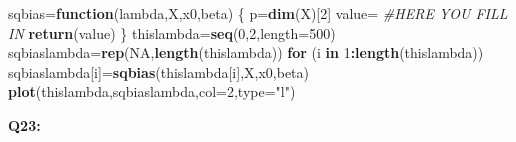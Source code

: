 \documentclass[]{article}
\newenvironment{Shaded}{\begin{snugshade}}{\end{snugshade}}
\newcommand{\KeywordTok}[1]{\textcolor[rgb]{0.13,0.29,0.53}{\textbf{#1}}}
\newcommand{\DataTypeTok}[1]{\textcolor[rgb]{0.13,0.29,0.53}{#1}}
\newcommand{\DecValTok}[1]{\textcolor[rgb]{0.00,0.00,0.81}{#1}}
\newcommand{\StringTok}[1]{\textcolor[rgb]{0.31,0.60,0.02}{#1}}
\newcommand{\CommentTok}[1]{\textcolor[rgb]{0.56,0.35,0.01}{\textit{#1}}}
\newcommand{\OtherTok}[1]{\textcolor[rgb]{0.56,0.35,0.01}{#1}}
\newcommand{\ControlFlowTok}[1]{\textcolor[rgb]{0.13,0.29,0.53}{\textbf{#1}}}
\newcommand{\OperatorTok}[1]{\textcolor[rgb]{0.81,0.36,0.00}{\textbf{#1}}}
\newcommand{\NormalTok}[1]{#1}
\begin{document}
\begin{Shaded}
\begin{Highlighting}[]
\NormalTok{sqbias=}\ControlFlowTok{function}\NormalTok{(lambda,X,x0,beta)}
\NormalTok{\{}
\NormalTok{  p=}\KeywordTok{dim}\NormalTok{(X)[}\DecValTok{2}\NormalTok{]}
\NormalTok{  value=}\StringTok{ }\CommentTok{#HERE YOU FILL IN}
\StringTok{  }\KeywordTok{return}\NormalTok{(value)}
\NormalTok{\}}
\NormalTok{thislambda=}\KeywordTok{seq}\NormalTok{(}\DecValTok{0}\NormalTok{,}\DecValTok{2}\NormalTok{,}\DataTypeTok{length=}\DecValTok{500}\NormalTok{)}
\NormalTok{sqbiaslambda=}\KeywordTok{rep}\NormalTok{(}\OtherTok{NA}\NormalTok{,}\KeywordTok{length}\NormalTok{(thislambda))}
\ControlFlowTok{for}\NormalTok{ (i }\ControlFlowTok{in} \DecValTok{1}\OperatorTok{:}\KeywordTok{length}\NormalTok{(thislambda)) sqbiaslambda[i]=}\KeywordTok{sqbias}\NormalTok{(thislambda[i],X,x0,beta)}
\KeywordTok{plot}\NormalTok{(thislambda,sqbiaslambda,}\DataTypeTok{col=}\DecValTok{2}\NormalTok{,}\DataTypeTok{type=}\StringTok{"l"}\NormalTok{)}
\end{Highlighting}
\end{Shaded}

\textbf{Q23:}

\begin{Shaded}
\end{Shaded}
\end{document}
